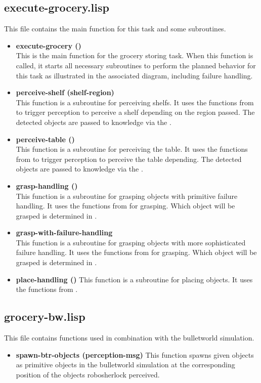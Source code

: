 \documentclass[main.tex]{subfiles}
\begin{document}
		\subsection{execute-grocery.lisp}
		This file contains the main function for this task and some subroutines.
		\begin{itemize}
			\item \textbf{execute-grocery ()} \\
			This is the main function for the grocery storing task. When this function is called, it starts all necessary subroutines to perform the planned behavior for this task as illustrated in the associated diagram, including failure handling.
			\item \textbf{perceive-shelf (shelf-region)} \\
			This function is a subroutine for perceiving shelfs. It uses the functions from  to trigger perception to perceive a shelf depending on the region passed. The detected objects are passed to knowledge via the .
			\item \textbf{perceive-table ()} \\
			This function is a subroutine for perceiving the table. It uses the functions from  to trigger perception to perceive the table depending. The detected objects are passed to knowledge via the .
			\item \textbf{grasp-handling ()} \\
			This function is a subroutine for grasping objects with primitive failure handling. It uses the functions from  for grasping. Which object will be grasped is determined in .
			\item \textbf{grasp-with-failure-handling} \\
			This function is a subroutine for grasping objects with more sophisticated failure handling. It uses the functions from  for grasping. Which object will be grasped is determined in .
			\item \textbf{place-handling ()}
			This function is a subroutine for placing objects. It uses the functions from .
		\end{itemize}
		
		\subsection{grocery-bw.lisp}
		This file contains functions used in combination with the bulletworld simulation.
		\begin{itemize}
			\item \textbf{spawn-btr-objects (perception-msg)}
			This function spawns given objects as primitive objects in the bulletworld simulation at the corresponding position of the objects robosherlock perceived.  
		\end{itemize}
	  	
\end{document}
